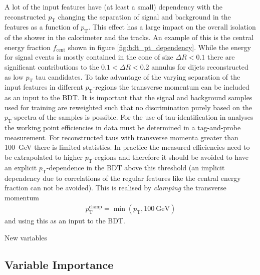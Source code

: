A lot of the input features have (at least a small) dependency with the
reconstructed $p_\text{T}$ changing the separation of signal and background in
the features as a function of $p_\text{T}$. This effect has a large impact on
the overall isolation of the shower in the calorimeter and the tracks. An
example of this is the central energy fraction $f_\text{cent}$ shown in figure
\ref{fig:bdt_pt_dependency}. While the energy for signal events is mostly
contained in the cone of size $\Delta R < 0.1$ there are significant
contributions to the $0.1 < \Delta R < 0.2$ annulus for dijets reconstructed as
low $p_\text{T}$ tau candidates. To take advantage of the varying separation of
the input features in different $p_\text{T}$-regions the transverse momentum can
be included as an input to the BDT. It is important that the signal and
background samples used for training are reweighted such that no discrimination
purely based on the $p_\text{T}$-spectra of the samples is possible. For the use
of tau-identification in analyses the working point efficiencies in data must be
determined in a tag-and-probe measurement. For reconstructed taus with
transverse momenta greater than \SI{100}{\giga\electronvolt} there is limited
statistics. In practice the measured efficiencies need to be extrapolated to
higher $p_\text{T}$-regions and therefore it should be avoided to have an
explicit $p_\text{T}$-dependence in the BDT above this threshold (an implicit
dependency due to correlations of the regular features like the central energy
fraction can not be avoided). This is realised by \emph{clamping} the transverse
momentum
\begin{align*}
  p_\text{T}^\text{clamp} = \min(p_\text{T}, \SI{100}{\giga\electronvolt})
\end{align*}
and using this as an input to the BDT.

\begin{table}[htb]
  \centering
  
  \caption{New variables}
  \label{tab:bdt_new_variables}
\end{table}

\subsection{Variable Importance}
\label{sec:bdt_var_importance}



